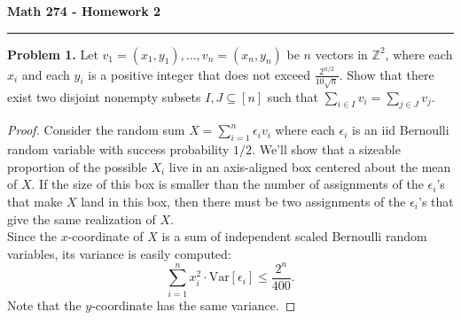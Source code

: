 \documentclass[11pt,letterpaper]{report}
\newcommand{\integers}{\mathbb{Z}}
\newcommand{\Var}{\text{Var}}
\begin{document}
\begin{center}
{\bf \Large Math 274 - Homework 2}
\vspace{0.2cm}
\hrule
\end{center}

\noindent\textbf{Problem 1. }
Let $v_1 = (x_1, y_1), \ldots, v_n = (x_n, y_n)$ be $n$ vectors in $\integers^2$, where each $x_i$ and each $y_i$ is a positive integer that does not exceed $\frac{2^{n/2}}{10\sqrt{n}}$.
Show that there exist two disjoint nonempty subsets $I, J\subseteq [n]$ such that $\sum_{i\in I}v_i = \sum_{j\in J}v_j$.

\begin{proof}
    Consider the random sum $X = \sum_{i=1}^n \epsilon_iv_i$ where each $\epsilon_i$ is an iid Bernoulli random variable with success probability $1/2$.
    We'll show that a sizeable proportion of the possible $X_i$ live in an axis-aligned box centered about the mean of $X$.
    If the size of this box is smaller than the number of assignments of the $\epsilon_i$'s that make $X$ land in this box, then there must be two assignments of the $\epsilon_i$'s that give the same realization of $X$.\\

    Since the $x$-coordinate of $X$ is a sum of independent scaled Bernoulli random variables, its variance is easily computed:
    \[
        \sum_{i=1}^nx_i^2\cdot \Var[\epsilon_i] \leq \frac{2^n}{400}.
    \]
    Note that the $y$-coordinate has the same variance.

\end{proof}
\end{document}
